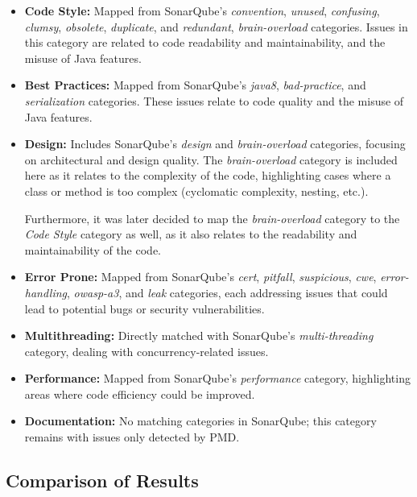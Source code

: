\begin{itemize}
    \item \textbf{Code Style:} Mapped from SonarQube's \textit{convention}, \textit{unused}, \textit{confusing}, \textit{clumsy}, \textit{obsolete}, \textit{duplicate}, and \textit{redundant}, \textit{brain-overload} categories. Issues in this category are related to code readability and maintainability, and the misuse of Java features.

    \item \textbf{Best Practices:} Mapped from SonarQube's \textit{java8}, \textit{bad-practice}, and \textit{serialization} categories. These issues relate to code quality and the misuse of Java features.

    \item \textbf{Design:} Includes SonarQube's \textit{design} and \textit{brain-overload} categories, focusing on architectural and design quality. The \textit{brain-overload} category is included here as it relates to the complexity of the code, highlighting cases where a class or method is too complex (cyclomatic complexity, nesting, etc.).

    Furthermore, it was later decided to map the \textit{brain-overload} category to the \textit{Code Style} category as well, as it also relates to the readability and maintainability of the code.

    \item \textbf{Error Prone:} Mapped from SonarQube's \textit{cert}, \textit{pitfall}, \textit{suspicious}, \textit{cwe}, \textit{error-handling}, \textit{owasp-a3}, and \textit{leak} categories, each addressing issues that could lead to potential bugs or security vulnerabilities.

    \item \textbf{Multithreading:} Directly matched with SonarQube's \textit{multi-threading} category, dealing with concurrency-related issues.

    \item \textbf{Performance:} Mapped from SonarQube's \textit{performance} category, highlighting areas where code efficiency could be improved.

    \item \textbf{Documentation:} No matching categories in SonarQube; this category remains with issues only detected by PMD.
\end{itemize}

\subsection{Comparison of Results}

